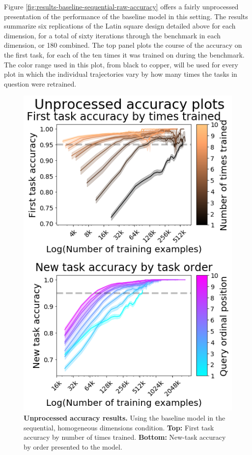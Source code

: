 Figure \ref{fig:results-baseline-sequential-raw-accuracy} offers a fairly unprocessed presentation of the performance of the baseline model in this setting. The results summarize six replications of the Latin square design detailed above for each dimension, for a total of sixty iterations through the benchmark in each dimension, or 180 combined. The top panel plots the course of the accuracy on the first task, for each of the ten times it was trained on during the benchmark. The color range used in this plot, from black to copper, will be used for every plot in which the individual trajectories vary by how many times the tasks in question were retrained. 
\begin{figure}
\vspace{-.3in}
\begin{spacing}{1.0}
\centering
\includegraphics[width=0.95\linewidth]{ch-results/figures/baseline_sequential/unprocessed_accuracy.png}
\caption{ {\bf Unprocessed accuracy results.} Using the baseline model in the sequential, homogeneous dimensions condition. \textbf{Top:} First task accuracy by number of times trained. \textbf{Bottom:} New-task accuracy by order presented to the model. }
\label{fig:results-baseline-sequential-unprocessed-accuracy}
\end{spacing}
\end{figure}
